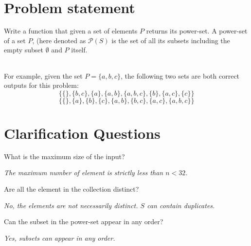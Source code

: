 \section{Problem statement}
	\begin{exercise}
		Write a function that given a set of elements $P$ returns its power-set. A power-set of a set $P$,
		(here denoted as $\mathcal{P}(S)$ is the set of all its subsets including the empty subset
		$\emptyset$ and $P$ itself.

		\begin{example}
			\hfill \\
			For example, given the set $P=\{a,b,c\}$, the following two sets are both correct outputs for
			this problem:
			\begin{equation*}
				\{\{\}, \{b,c\}, \{a\}, \{a,b\}, \{a,b,c\}, \{b\}, \{a,c\}, \{c\} \}
			\end{equation*}
			\begin{equation*}
				\{\{\}, \{a\}, \{b\}, \{c\}, \{a,b\}, \{b,c\}, \{a,c\}, \{a,b,c\} \}
			\end{equation*}
			
		\end{example}
	\end{exercise}
\section{Clarification Questions}

\begin{QandA}
	\item What is the maximum size of the input?
	\begin{answered}
		\textit{The maximum number of element is strictly less than $n < 32$.}
	\end{answered}
	
	\item Are all the element in the collection distinct?
	\begin{answered}
		\textit{No, the elements are not necessarily distinct. $S$ can contain duplicates.}
	\end{answered}

	\item Can the subset in the power-set appear in any order?
	\begin{answered}
		\textit{Yes, subsets can appear in any order.}
	\end{answered}
\end{QandA}

